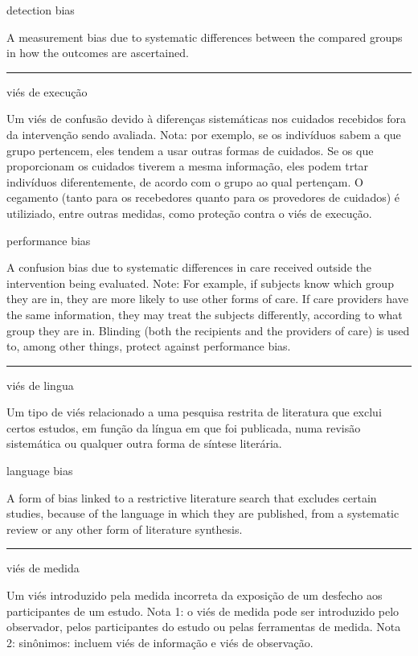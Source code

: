 \documentclass[
]{book}
\begin{document}
detection bias

A measurement bias due to systematic differences between the compared groups in how the outcomes are ascertained.

\begin{center}\rule{0.5\linewidth}{0.5pt}\end{center}

viés de execução

Um viés de confusão devido à diferenças sistemáticas nos cuidados recebidos fora da intervenção sendo avaliada. Nota: por exemplo, se os indivíduos sabem a que grupo pertencem, eles tendem a usar outras formas de cuidados. Se os que proporcionam os cuidados tiverem a mesma informação, eles podem trtar indivíduos diferentemente, de acordo com o grupo ao qual pertençam. O cegamento (tanto para os recebedores quanto para os provedores de cuidados) é utiliziado, entre outras medidas, como proteção contra o viés de execução.

performance bias

A confusion bias due to systematic differences in care received outside the intervention being evaluated. Note: For example, if subjects know which group they are in, they are more likely to use other forms of care. If care providers have the same information, they may treat the subjects differently, according to what group they are in. Blinding (both the recipients and the providers of care) is used to, among other things, protect against performance bias.

\begin{center}\rule{0.5\linewidth}{0.5pt}\end{center}

viés de lingua

Um tipo de viés relacionado a uma pesquisa restrita de literatura que exclui certos estudos, em função da língua em que foi publicada, numa revisão sistemática ou qualquer outra forma de síntese literária.

language bias

A form of bias linked to a restrictive literature search that excludes certain studies, because of the language in which they are published, from a systematic review or any other form of literature synthesis.

\begin{center}\rule{0.5\linewidth}{0.5pt}\end{center}

viés de medida

Um viés introduzido pela medida incorreta da exposição de um desfecho aos participantes de um estudo. Nota 1: o viés de medida pode ser introduzido pelo observador, pelos participantes do estudo ou pelas ferramentas de medida. Nota 2: sinônimos: incluem viés de informação e viés de observação.
\end{document}
